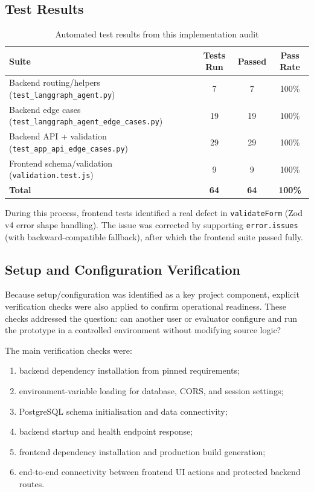 \documentclass[12pt]{article}
\begin{document}
\subsection{Test Results}

\begin{table}[h!]
\centering
\begin{tabular}{|l|c|c|c|}
\hline
\textbf{Suite} & \textbf{Tests Run} & \textbf{Passed} & \textbf{Pass Rate} \\
\hline
Backend routing/helpers (\texttt{test\_langgraph\_agent.py}) & 7 & 7 & 100\% \\
\hline
Backend edge cases (\texttt{test\_langgraph\_agent\_edge\_cases.py}) & 19 & 19 & 100\% \\
\hline
Backend API + validation (\texttt{test\_app\_api\_edge\_cases.py}) & 29 & 29 & 100\% \\
\hline
Frontend schema/validation (\texttt{validation.test.js}) & 9 & 9 & 100\% \\
\hline
\textbf{Total} & \textbf{64} & \textbf{64} & \textbf{100\%} \\
\hline
\end{tabular}
\caption{Automated test results from this implementation audit}
\label{tab:test_results}
\end{table}

During this process, frontend tests identified a real defect in \texttt{validateForm} (Zod v4 error shape handling). The issue was corrected by supporting \texttt{error.issues} (with backward-compatible fallback), after which the frontend suite passed fully.

\subsection{Setup and Configuration Verification}
Because setup/configuration was identified as a key project component, explicit verification checks were also applied to confirm operational readiness. These checks addressed the question: can another user or evaluator configure and run the prototype in a controlled environment without modifying source logic?

The main verification checks were:
\begin{enumerate}
    \item backend dependency installation from pinned requirements;
    \item environment-variable loading for database, CORS, and session settings;
    \item PostgreSQL schema initialisation and data connectivity;
    \item backend startup and health endpoint response;
    \item frontend dependency installation and production build generation;
    \item end-to-end connectivity between frontend UI actions and protected backend routes.
\end{enumerate}
\end{document}
